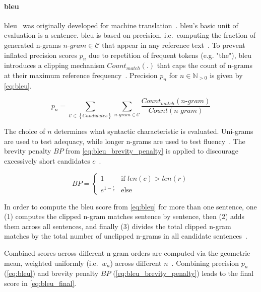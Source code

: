 \paragraph{\ac{bleu}}
\ac{bleu}~\citep{papineni_bleu_2001} was originally developed for machine translation~\citep{zhou_paraphrase_2021,anantha_pearson_metrics_2021}. 
\ac{bleu}'s basic unit of evaluation is a sentence. 
\ac{bleu} is based on precision, i.e.\ computing the fraction of generated n-grams $n\text{-}gram \in \mathcal{C}$ that appear in any reference text~\citep{kurt_pehlivanoglu_comparative_2024,palivela_optimization_2021,papineni_bleu_2001,anantha_pearson_metrics_2021}. 
To prevent inflated precision scores $p_n$ due to repetition of frequent tokens (e.g. "the"), \ac{bleu} introduces a clipping mechanism $Count_{match}(.)$ that caps the count of n-grams at their maximum reference frequency~\citep{papineni_bleu_2001}. 
Precision $p_n$ for $n \in \mathbb{N}_{>0}$ is given by \autoref{eq:bleu}.

\begin{equation}
    p_n = \sum_{\mathcal{C} \in \left\{ Candidates \right\}}\sum_{n\text{-}gram \in\mathcal{C}} \frac{Count_{match}(n\text{-}gram)}{Count(n\text{-}gram)}
\label{eq:bleu}
\end{equation}

The choice of $n$ determines what syntactic characteristic is evaluated.
Uni-grams are used to test adequacy, while longer n-grams are used to test fluency~\citep{papineni_bleu_2001}. 
The brevity penalty $BP$ from \autoref{eq:bleu_brevity_penalty} is applied to discourage excessively short candidates $c$~\citep{papineni_bleu_2001}.

\begin{equation}
    BP = \begin{cases}
        1 & \text{if } len(c) > len(r) \\
        e^{1 - \frac{r}{c}} & \text{else}
    \end{cases}
\label{eq:bleu_brevity_penalty}
\end{equation}

In order to compute the \ac{bleu} score from \autoref{eq:bleu} for more than one sentence, 
one (1) computes the clipped n-gram matches sentence by sentence, 
then (2) adds them across all sentences, 
and finally (3) divides the total clipped n-gram matches by 
the total number of unclipped n-grams in all candidate sentences~\citep{papineni_bleu_2001,cordeiro_bleu_2007}.

Combined scores across different n-gram orders are computed via the geometric mean, weighted uniformly (i.e.\ $w_n$) across different $n$~\citep{papineni_bleu_2001,banerjee_METEOR_2005}.
Combining precision $p_n$ (\autoref{eq:bleu}) and brevity penalty $BP$ (\autoref{eq:bleu_brevity_penalty}) leads to the final score in \autoref{eq:bleu_final}.

